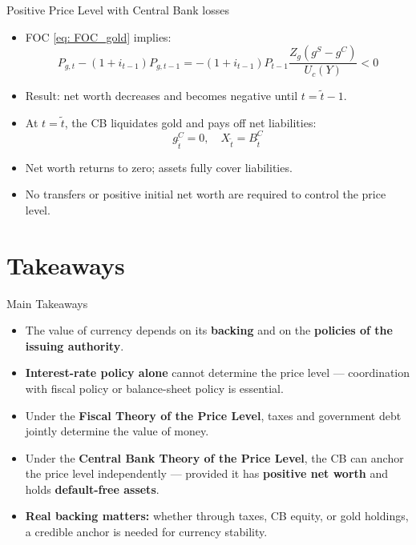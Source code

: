 \documentclass[11pt,aspectratio=169]{beamer}
\begin{document}
\begin{frame}{Positive Price Level with Central Bank losses}
\begin{itemize}
    \item FOC \eqref{eq: FOC_gold} implies:
    \[
        P_{g,t} - (1+i_{t-1}) P_{g,t-1} = -(1+i_{t-1}) P_{t-1} \frac{Z_g(g^S - g^C)}{U_c(Y)} < 0
    \]
    \item Result: net worth decreases and becomes negative until $t = \tilde{t}-1$.
\end{itemize}
\begin{itemize}
    \item At $t = \tilde{t}$, the CB liquidates gold and pays off net liabilities:
    \[
        g_{\tilde{t}}^C = 0, \quad X_{\tilde{t}} = B_{\tilde{t}}^C
    \]
    \item Net worth returns to zero; assets fully cover liabilities.
    \item No transfers or positive initial net worth are required to control the price level.
\end{itemize}
\end{frame}
\fi


\section{Takeaways}

\begin{frame}{Main Takeaways}
\small
\begin{itemize}
  \item The value of currency depends on its \textbf{backing} and on the \textbf{policies of the issuing authority}.
  
  \vspace{0.2cm}
  \item \textbf{Interest-rate policy alone} cannot determine the price level — coordination with fiscal policy or balance-sheet policy is essential.
  
  \vspace{0.2cm}
  \item Under the \textbf{Fiscal Theory of the Price Level}, taxes and government debt jointly determine the value of money.
  
  \vspace{0.2cm}
  \item Under the \textbf{Central Bank Theory of the Price Level}, the CB can anchor the price level independently — provided it has \textbf{positive net worth} and holds \textbf{default-free assets}.
  
  \vspace{0.2cm}
  \item \textbf{Real backing matters:} whether through taxes, CB equity, or gold holdings, a credible anchor is needed for currency stability.
\end{itemize}
\end{frame}
\end{document}
